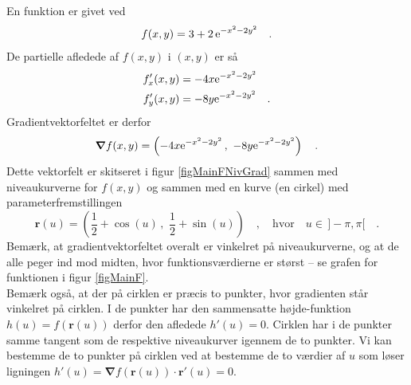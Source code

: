 \begin{example} \label{exampMainF}
En funktion er givet ved
\begin{equation} \label{eqMainF}
f(x,y) = 3 +  2\,\mathrm{e}^{-x^{2} - 2y^{2}} \quad .
\end{equation}
De partielle afledede af $f(x,y)$ i $(x,y)$ er så
\begin{equation}
\begin{aligned}
f'_{x}(x,y) &=  -4x\mathrm{e}^{-x^{2} - 2y^{2}}\\
f'_{y}(x,y) &=  -8y\mathrm{e}^{-x^{2} - 2y^{2}}  \quad .
\end{aligned}
\end{equation}
Gradientvektorfeltet er derfor
\begin{equation}
{\bm{\nabla}}f(x, y) = \left( -4x\mathrm{e}^{-x^{2} - 2y^{2}}\, , \,\, -8y\mathrm{e}^{-x^{2} - 2y^{2}} \right) \quad.
\end{equation}
Dette vektorfelt er skitseret i figur \ref{figMainFNivGrad} sammen med niveaukurverne for $f(x,y)$ og sammen med en kurve (en cirkel) med parameterfremstillingen
\begin{equation}
\mathbf{r}(u) = \left(\frac{1}{2} + \cos(u) \, , \,\, \frac{1}{2} + \sin(u) \right) \quad , \quad \textrm{hvor} \quad u \in\, ]-\pi, \pi[ \quad.
\end{equation}
Bemærk, at gradientvektorfeltet overalt er vinkelret på niveaukurverne, og at de alle peger ind mod midten, hvor funktionsværdierne er størst -- se grafen for funktionen i figur \ref{figMainF}.\\

Bemærk også, at der på cirklen er præcis to punkter, hvor gradienten står vinkelret på cirklen. I de punkter har  den sammensatte højde-funktion $h(u) = f(\mathbf{r}(u))$ derfor den afledede $h'(u) = 0$. Cirklen har i de punkter samme tangent som de respektive niveaukurver igennem de to punkter. Vi kan bestemme de to punkter på cirklen ved  at bestemme de to værdier af $u$ som løser ligningen $h'(u) = {\bm{\nabla}}f(\mathbf{r}(u)) \,{\bm{\cdot}}\, \mathbf{r}'(u) = 0 $.

\end{example}

